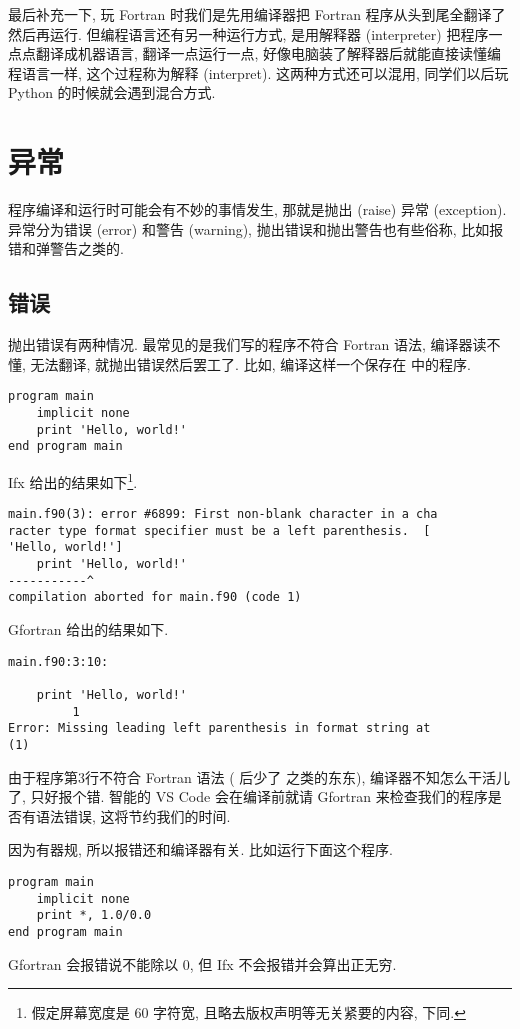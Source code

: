 最后补充一下, 玩 Fortran 时我们是先用编译器把 Fortran 程序从头到尾全翻译了然后再运行. 但编程语言还有另一种运行方式, 是用解释器 (interpreter) 把程序一点点翻译成机器语言, 翻译一点运行一点, 好像电脑装了解释器后就能直接读懂编程语言一样, 这个过程称为解释 (interpret). 这两种方式还可以混用, 同学们以后玩 Python 的时候就会遇到混合方式.

\section{异常}\label{fortran_exception}

程序编译和运行时可能会有不妙的事情发生, 那就是抛出 (raise) 异常 (exception). 异常分为错误 (error) 和警告 (warning), 抛出错误和抛出警告也有些俗称, 比如报错和弹警告之类的.

\subsection{错误}\label{fortran_error}

抛出错误有两种情况. 最常见的是我们写的程序不符合 Fortran 语法, 编译器读不懂, 无法翻译, 就抛出错误然后罢工了. 比如, 编译这样一个保存在  中的程序.
\begin{lstlisting}
program main
    implicit none
    print 'Hello, world!'
end program main
\end{lstlisting}
Ifx 给出的结果如下\footnote{
    假定屏幕宽度是 60 字符宽, 且略去版权声明等无关紧要的内容, 下同.
}.
\begin{verbatim}
main.f90(3): error #6899: First non-blank character in a cha
racter type format specifier must be a left parenthesis.  [
'Hello, world!']
    print 'Hello, world!'
-----------^
compilation aborted for main.f90 (code 1)
\end{verbatim}
Gfortran 给出的结果如下.
\begin{verbatim}
main.f90:3:10:

    print 'Hello, world!'
         1
Error: Missing leading left parenthesis in format string at 
(1)
\end{verbatim}
由于程序第3行不符合 Fortran 语法 ( 后少了 \ttt{*,} 之类的东东), 编译器不知怎么干活儿了, 只好报个错. 智能的 VS Code 会在编译前就请 Gfortran 来检查我们的程序是否有语法错误, 这将节约我们的时间.

因为有器规, 所以报错还和编译器有关. 比如运行下面这个程序.
\begin{lstlisting}
program main
    implicit none
    print *, 1.0/0.0
end program main
\end{lstlisting}
Gfortran 会报错说不能除以 $0$, 但 Ifx 不会报错并会算出正无穷.

